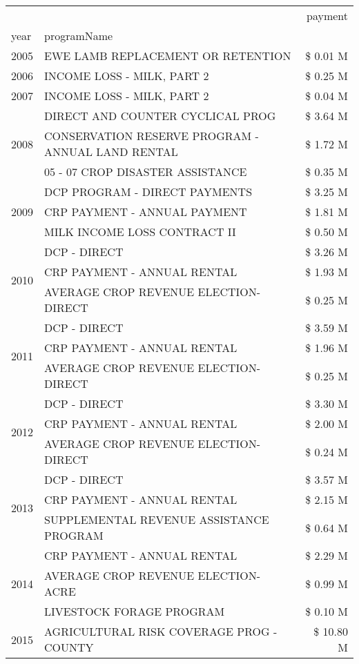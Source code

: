 \begin{tabular}{llr}
\toprule
 &  & payment \\
year & programName &  \\
\midrule
2005 & EWE LAMB REPLACEMENT OR RETENTION & \$ 0.01 M \\
\cline{1-3}
2006 & INCOME LOSS - MILK, PART 2 & \$ 0.25 M \\
\cline{1-3}
2007 & INCOME LOSS - MILK, PART 2 & \$ 0.04 M \\
\cline{1-3}
\multirow[t]{3}{*}{2008} & DIRECT AND COUNTER CYCLICAL PROG & \$ 3.64 M \\
 & CONSERVATION RESERVE PROGRAM - ANNUAL LAND RENTAL & \$ 1.72 M \\
 & 05 - 07 CROP DISASTER ASSISTANCE & \$ 0.35 M \\
\cline{1-3}
\multirow[t]{3}{*}{2009} & DCP PROGRAM - DIRECT PAYMENTS & \$ 3.25 M \\
 & CRP PAYMENT - ANNUAL PAYMENT & \$ 1.81 M \\
 & MILK INCOME LOSS CONTRACT II & \$ 0.50 M \\
\cline{1-3}
\multirow[t]{3}{*}{2010} & DCP - DIRECT & \$ 3.26 M \\
 & CRP PAYMENT - ANNUAL RENTAL & \$ 1.93 M \\
 & AVERAGE CROP REVENUE ELECTION-DIRECT & \$ 0.25 M \\
\cline{1-3}
\multirow[t]{3}{*}{2011} & DCP - DIRECT & \$ 3.59 M \\
 & CRP PAYMENT - ANNUAL RENTAL & \$ 1.96 M \\
 & AVERAGE CROP REVENUE ELECTION-DIRECT & \$ 0.25 M \\
\cline{1-3}
\multirow[t]{3}{*}{2012} & DCP - DIRECT & \$ 3.30 M \\
 & CRP PAYMENT - ANNUAL RENTAL & \$ 2.00 M \\
 & AVERAGE CROP REVENUE ELECTION-DIRECT & \$ 0.24 M \\
\cline{1-3}
\multirow[t]{3}{*}{2013} & DCP - DIRECT & \$ 3.57 M \\
 & CRP PAYMENT - ANNUAL RENTAL & \$ 2.15 M \\
 & SUPPLEMENTAL REVENUE ASSISTANCE PROGRAM & \$ 0.64 M \\
\cline{1-3}
\multirow[t]{3}{*}{2014} & CRP PAYMENT - ANNUAL RENTAL & \$ 2.29 M \\
 & AVERAGE CROP REVENUE ELECTION-ACRE & \$ 0.99 M \\
 & LIVESTOCK FORAGE PROGRAM & \$ 0.10 M \\
\cline{1-3}
\multirow[t]{3}{*}{2015} & AGRICULTURAL RISK COVERAGE PROG - COUNTY & \$ 10.80 M \\

\end{tabular}
